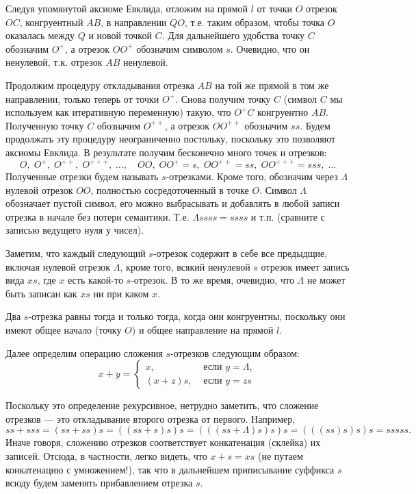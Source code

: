 Следуя упомянутой аксиоме Евклида, отложим на прямой $l$ от точки $O$ отрезок $OC$, конгруентный $AB$, в направлении $QO$, т.е. таким образом, чтобы точка $O$ оказалась между $Q$ и новой точкой $C$. Для дальнейшего удобства точку $C$ обозначим $O^+$, а отрезок $OO^+$ обозначим символом $s$. Очевидно, что он ненулевой, т.к. отрезок $AB$ ненулевой.

Продолжим процедуру откладывания отрезка $AB$ на той же прямой в том же направлении, только теперь от точки $O^+$. Снова получим точку $C$ (символ $C$ мы используем как итеративную переменную) такую, что $O^+C$ конгруентно $AB$. Полученную точку $C$ обозначим $O^{++}$, а отрезок $OO^{++}$ обозначим $ss$. Будем продолжать эту процедуру неограниченно постольку, поскольку это позволяют аксиомы Евклида. В результате получим бесконечно много точек и отрезков:
$$
O,\;O^+,\;O^{++},\;O^{+++},\;\dots,\quad OO,\;OO^+=s,\;OO^{++}=ss,\;OO^{+++}=sss,\;\dots
$$
Полученные отрезки будем называть $s$-отрезками. Кроме того, обозначим через $\Lambda$ нулевой отрезок $OO$, полностью сосредоточенный в точке $O$. Символ $\Lambda$ обозначает пустой символ, его можно выбрасывать и добавлять в любой записи отрезка в начале без потери семантики. Т.е. $\Lambda ssss=ssss$ и т.п. (сравните с записью ведущего нуля у чисел).

Заметим, что каждый следующий $s$-отрезок содержит в себе все предыдщие, включая нулевой отрезок $\Lambda$, кроме того, всякий ненулевой $s$ отрезок имеет запись вида $xs$, где $x$ есть какой-то $s$-отрезок. В то же время, очевидно, что $\Lambda$ не может быть записан как $xs$ ни при каком $x$.

Два $s$-отрезка равны тогда и только тогда, когда они конгруентны, поскольку они имеют общее начало (точку $O$) и общее направление на прямой $l$.

Далее определим операцию сложения $s$-отрезков следующим образом:
$$
x+y = 
\begin{cases}
x, & \mbox{ если }y=\Lambda,\\
(x+z)s, & \mbox{ если }y=zs
\end{cases}
$$

Поскольку это определение рекурсивное, нетрудно заметить, что сложение отрезков --- это откладывание второго отрезка от первого. Например,
$$
ss+sss = (ss+ss)s = ((ss+s)s)s = (((ss+\Lambda)s)s)s = (((ss)s)s)s = sssss.
$$
Иначе говоря, сложению отрезков соответствует конкатенация (склейка) их записей. Отсюда, в частности, легко видеть, что $x+s=xs$ (не путаем конкатенацию с умножением!), так что в дальнейшем приписывание суффикса $s$ всюду будем заменять прибавлением отрезка $s$.

